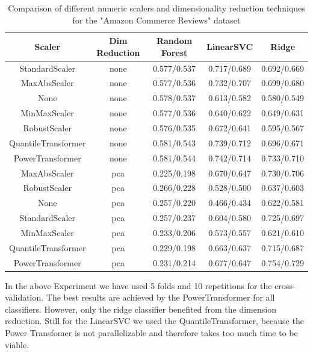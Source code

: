 \documentclass[a4paper,10pt]{article}
\begin{document}
\begin{table}[h!]
\centering
\small
\begin{tabular}{|c|c|c|c|c|}
\hline
\textbf{Scaler} & \textbf{Dim Reduction} & \textbf{Random Forest} & \textbf{LinearSVC} & \textbf{Ridge} \\
\hline
StandardScaler & none & 0.577/0.537 & 0.717/0.689 & 0.692/0.669 \\
\hline
MaxAbsScaler & none & 0.577/0.536 & 0.732/0.707 & 0.699/0.680 \\
\hline
None & none & 0.578/0.537 & 0.613/0.582 & 0.580/0.549 \\
\hline
MinMaxScaler & none & 0.577/0.536 & 0.640/0.622 & 0.649/0.631 \\
\hline
RobustScaler & none & 0.576/0.535 & 0.672/0.641 & 0.595/0.567 \\
\hline
QuantileTransformer & none &  0.581/0.543 & \cellcolor[HTML]{C1E1C1}0.739/0.712 & 0.696/0.671 \\
\hline
PowerTransformer & none &   \cellcolor[HTML]{C1E1C1} 0.581/0.544 &   0.742/0.714 & 0.733/0.710 \\
\hline
MaxAbsScaler & pca & 0.225/0.198 & 0.670/0.647 & 0.730/0.706 \\
\hline
RobustScaler & pca & 0.266/0.228 & 0.528/0.500 & 0.637/0.603 \\
\hline
None & pca & 0.257/0.220 & 0.466/0.434 & 0.622/0.581 \\
\hline
StandardScaler & pca & 0.257/0.237 & 0.604/0.580 & 0.725/0.697 \\
\hline
MinMaxScaler & pca & 0.233/0.206 & 0.573/0.557 & 0.621/0.610 \\
\hline
QuantileTransformer & pca & 0.229/0.198 & 0.663/0.637 & 0.715/0.687 \\
\hline
PowerTransformer & pca & 0.231/0.214 & 0.677/0.647 & \cellcolor[HTML]{C1E1C1}  0.754/0.729 \\
\hline
\end{tabular}
\caption{Comparison of different numeric scalers and dimensionality reduction techniques for the "Amazon Commerce Reviews" dataset}
\label{table:scaling}
\end{table}







In the above Experiment we have used 5 folds and 10 repetitions for the cross-validation. The best results are achieved by the PowerTransformer for all classifiers. However, only the ridge classifier benefited from the
dimension reduction. Still for the LinearSVC we used the QuantileTransformer, because the Power Transfomer is not parallelizable and therefore takes too much time to be viable.
\end{document}

